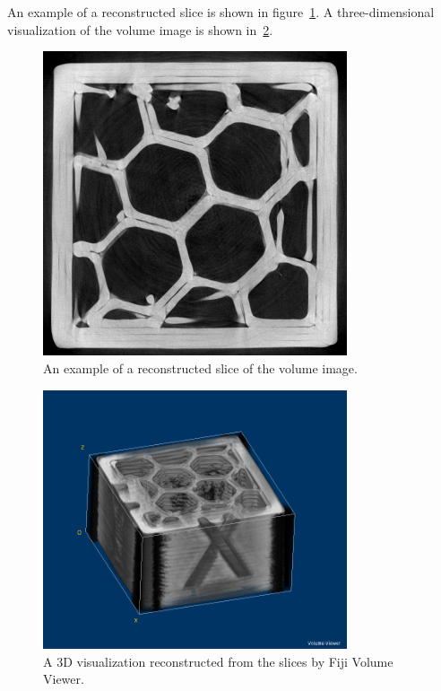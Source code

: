 \documentclass[a4paper,twoside,12pt]{article}
\begin{document}
An example of a reconstructed slice is shown in figure~\ref{fig:slice}. A three-dimensional visualization of the volume image is shown in~\ref{fig:volume_viewer}.
\begin{figure}
    \centering
    \includegraphics[width=0.8\textwidth]{images/slice_example.png}
    \caption{An example of a reconstructed slice of the volume image.}
    \label{fig:slice}
\end{figure}
\begin{figure}
    \centering
    \includegraphics[width=0.8\textwidth]{images/volume_viewer.png}
    \caption{A 3D visualization reconstructed from the slices by Fiji Volume Viewer.}
    \label{fig:volume_viewer}
\end{figure}
\end{document}
